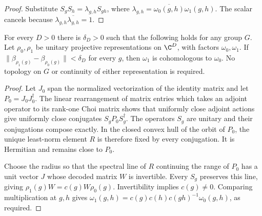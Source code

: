 \begin{proof}\leanok
    Substitute $S_gS_h=\lambda_{g,h}S_{gh}$, where
    $\lambda_{g,h}=\overline{\omega_0(g,h)}\omega_1(g,h)$.
    The scalar cancels because $\lambda_{g,h}\overline{\lambda_{g,h}}=1$.
\end{proof}

\begin{lemma}
    \label{thm:spc_aux_uniform_projective_rigidity}
    \leanok
    For every $D>0$ there is $\delta_D>0$ such that the following holds
    for any group $G$. Let $\rho_0,\rho_1$ be unitary projective
    representations on $\C^D$, with factors $\omega_0,\omega_1$.
    If $\|\beta_{\rho_1(g)}-\beta_{\rho_0(g)}\|<\delta_D$ for every $g$,
    then $\omega_1$ is cohomologous to $\omega_0$.
    No topology on $G$ or continuity of either representation is required.
\end{lemma}

\begin{proof}\leanok
    Let $J_0$ span the normalized vectorization of the identity matrix
    and let $P_0=J_0J_0^\dagger$. The linear rearrangement of matrix entries
    which takes an adjoint operator to its rank-one Choi matrix shows that
    uniformly close adjoint actions give uniformly close conjugates
    $S_gP_0S_g^\dagger$. The operators $S_g$ are unitary and their
    conjugations compose exactly. In the closed convex hull of the orbit
    of $P_0$, the unique least-norm element $R$ is therefore fixed by every
    conjugation. It is Hermitian and remains close to $P_0$.

    Choose the radius so that the spectral line of $R$ continuing the
    range of $P_0$ has a unit vector $J$ whose decoded matrix $W$ is
    invertible. Every $S_g$ preserves this line, giving
    $\rho_1(g)W=c(g)W\rho_0(g)$. Invertibility implies $c(g)\neq0$.
    Comparing multiplication at $g,h$ gives
    $\omega_1(g,h)=c(g)c(h)c(gh)^{-1}\omega_0(g,h)$, as required.
\end{proof}

